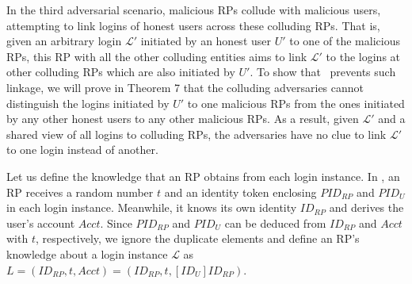 

\vspace{2mm}

In the third adversarial scenario, malicious RPs collude with malicious users, attempting to link logins of honest users across these colluding RPs. That is, given an arbitrary login $\mathcal{L'}$ initiated by an honest user $U'$ to one of the malicious RPs, this RP with all the other colluding entities aims to link $\mathcal{L'}$ to the logins at other colluding RPs which are also initiated by $U'$. To show that \usso~prevents such linkage, we will prove in Theorem 7 that the colluding adversaries cannot distinguish the logins initiated by $U'$ to one malicious RPs from the ones initiated by any other honest users to any other malicious RPs. As a result, given $\mathcal{L'}$ and a shared view of all logins to colluding RPs, the adversaries have no clue to link $\mathcal{L'}$ to one login instead of another.

Let us define the knowledge that an RP obtains from each login instance. In \usso, an RP receives a random number $t$ and an identity token enclosing $PID_{RP}$ and $PID_U$ in each login instance. Meanwhile, it knows its own identity $ID_{RP}$ and derives the user's account $Acct$. Since $PID_{RP}$ and $PID_U$ can be deduced from $ID_{RP}$ and $Acct$ with $t$, respectively, we ignore the duplicate elements and define an RP's knowledge about a login instance $\mathcal{L}$ as $L=(ID_{RP}, t, Acct)=(ID_{RP}, t, [ID_{U}]ID_{RP})$. %

